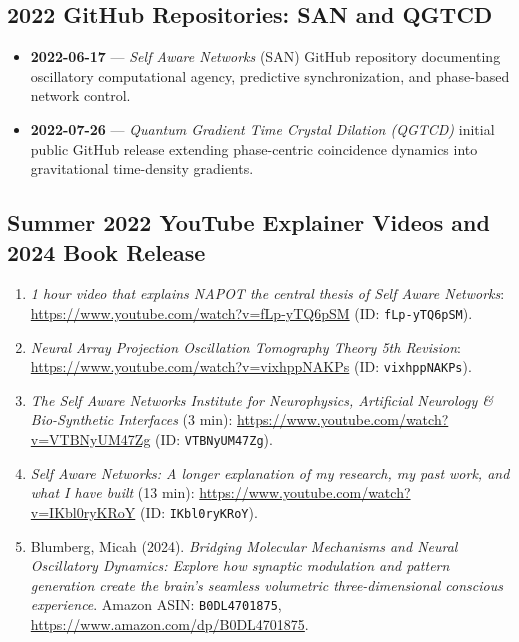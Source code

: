 \subsection{2022 GitHub Repositories: SAN and QGTCD}
\begin{itemize}
  \item \textbf{2022-06-17} --- \emph{Self Aware Networks} (SAN) GitHub repository documenting oscillatory computational agency, predictive synchronization, and phase-based network control.
  \item \textbf{2022-07-26} --- \emph{Quantum Gradient Time Crystal Dilation (QGTCD)} initial public GitHub release extending phase-centric coincidence dynamics into gravitational time-density gradients.
\end{itemize}

\subsection{Summer 2022 YouTube Explainer Videos and 2024 Book Release}
\begin{enumerate}[leftmargin=2em]
  \item \emph{1 hour video that explains NAPOT the central thesis of Self Aware Networks}: \url{https://www.youtube.com/watch?v=fLp-yTQ6pSM} (ID: \texttt{fLp-yTQ6pSM}).
  \item \emph{Neural Array Projection Oscillation Tomography Theory 5th Revision}: \url{https://www.youtube.com/watch?v=vixhppNAKPs} (ID: \texttt{vixhppNAKPs}).
  \item \emph{The Self Aware Networks Institute for Neurophysics, Artificial Neurology \& Bio-Synthetic Interfaces} (3 min): \url{https://www.youtube.com/watch?v=VTBNyUM47Zg} (ID: \texttt{VTBNyUM47Zg}).
  \item \emph{Self Aware Networks: A longer explanation of my research, my past work, and what I have built} (13 min): \url{https://www.youtube.com/watch?v=IKbl0ryKRoY} (ID: \texttt{IKbl0ryKRoY}).
  \item Blumberg, Micah (2024). \emph{Bridging Molecular Mechanisms and Neural Oscillatory Dynamics: Explore how synaptic modulation and pattern generation create the brain's seamless volumetric three-dimensional conscious experience}. Amazon ASIN: \texttt{B0DL4701875}, \url{https://www.amazon.com/dp/B0DL4701875}.
\end{enumerate}

